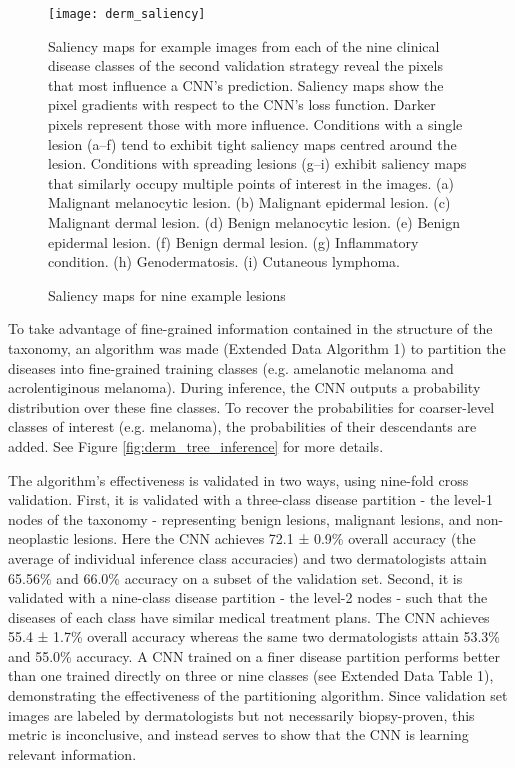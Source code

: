 \begin{figure}
\texttt{[image: derm\_saliency]}
\caption{Saliency maps for nine example lesions}
\vspace{12px}
Saliency maps for example images from each of the nine clinical disease classes of the second validation strategy reveal the pixels that most influence a CNN’s prediction. Saliency maps show the pixel gradients with respect to the CNN’s loss function. Darker pixels represent those with more influence. Conditions with a single lesion (a–f) tend to exhibit tight saliency maps centred around the lesion. Conditions with spreading lesions (g–i) exhibit saliency maps that similarly occupy multiple points of interest in the images. (a) Malignant melanocytic lesion. (b) Malignant epidermal lesion. (c) Malignant dermal lesion. (d) Benign melanocytic lesion. (e) Benign epidermal lesion. (f) Benign dermal lesion. (g) Inflammatory condition. (h) Genodermatosis. (i) Cutaneous lymphoma.
\label{fig:derm_saliency}
\end{figure}

To take advantage of fine-grained information contained in the structure of the taxonomy, an algorithm was made (Extended Data Algorithm 1) to partition the diseases into fine-grained training classes (e.g. amelanotic melanoma and acrolentiginous melanoma). During inference, the CNN outputs a probability distribution over these fine classes. To recover the probabilities for coarser-level classes of interest (e.g. melanoma), the probabilities of their descendants are added. See Figure \ref{fig:derm_tree_inference} for more details.

The algorithm’s effectiveness is validated in two ways, using nine-fold cross validation. First, it is validated with a three-class disease partition - the level-1 nodes of the taxonomy - representing benign lesions, malignant lesions, and non-neoplastic lesions. Here the CNN achieves 72.1 ± 0.9\% overall accuracy (the average of individual inference class accuracies) and two dermatologists attain 65.56\% and 66.0\% accuracy on a subset of the validation set. Second, it is validated with a nine-class disease partition - the level-2 nodes - such that the diseases of each class have similar medical treatment plans. The CNN achieves 55.4 ± 1.7\% overall accuracy whereas the same two dermatologists attain 53.3\% and 55.0\% accuracy. A CNN trained on a finer disease partition performs better than one trained directly on three or nine classes (see Extended Data Table 1), demonstrating the effectiveness of the partitioning algorithm. Since validation set images are labeled by dermatologists but not necessarily biopsy-proven, this metric is inconclusive, and instead serves to show that the CNN is learning relevant information.

